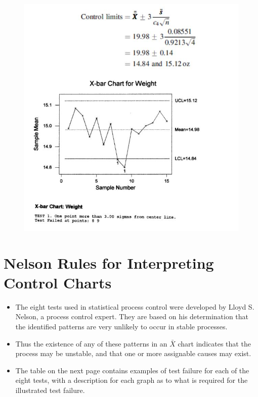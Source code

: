 \documentclass[]{report}
\begin{document}
{\begin{figure}[h!]
\end{figure}
\newpage
\begin{figure}[h!]
\centering
\includegraphics[width=1\linewidth]{images/WorkedExample1-chart}

\end{figure}

\newpage

\section{Nelson Rules for Interpreting Control Charts}
{\large
	\begin{itemize}
		\item The eight tests used in statistical process control were developed by Lloyd S. Nelson, a process control expert. They are
		based on his determination that the identified patterns are very unlikely to occur in stable processes.
		
		\item Thus
		the existence of any of these patterns in an $\bar{X}$ chart indicates that the process may be unstable, and that one or
		more assignable causes may exist. 
		
		\item The table on the next page contains examples of test failure for each of the eight tests,
		with a description for each graph as to what is required for the illustrated test failure.
		

\end{itemize}}}
\end{document}
